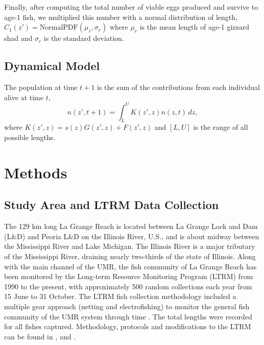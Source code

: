 \documentclass[preprint,review,12pt,authoryear]{elsarticle}
\def\ds{\displaystyle}
\begin{document}
Finally, after computing the total number of viable eggs produced and survive to age-1 fish, we multiplied this number with a normal distribution of length,
$ \ds C_1 (z') =  \mathrm{Normal PDF} (\mu_r, \sigma_r)$ where $\mu_r$ is the mean length of age-1 gizzard shad and $\sigma_r$ is the standard deviation. 

\subsection{Dynamical Model} 
The population at time $t+1$ is the sum of the contributions from each individual alive at time $t$,
\begin{equation}\label{eq:IPM}
n(z',t+1) = \int_L^U K(z',z)n(z,t) \,dz,
\end{equation}  
where $K(z',z) = s(z) G(z',z) + F(z',z)$ and $[L,U]$ is the range of all possible lengths.

\section{Methods}
\subsection{Study Area and LTRM Data Collection}
The 129 km long La Grange Reach is located between La Grange Lock and Dam (L\&D) and Peoria L\&D on the Illinois River, U.S., and is about midway between the Mississippi River and Lake Michigan. 
The Illinois River is a major tributary of the Mississippi River, draining nearly two-thirds of the state of Illinois. 
Along with the main channel of the UMR, the fish community of La Grange Reach has been monitored by the Long-term Resource Monitoring Program (LTRM) from 1990 to the present, with approximately 500 random collections each year from 15 June to 31 October. 
The LTRM fish collection methodology included a multiple gear approach (netting and electrofishing) to monitor the general fish community of the UMR system through time \citep{gutreuter1995long}. 
The total lengths were recorded for all fishes captured. 
Methodology, protocols and modifications to the LTRM can be found in \cite{gutreuter1995long}, and \cite{ickes2002evaluation}. 
\end{document}
